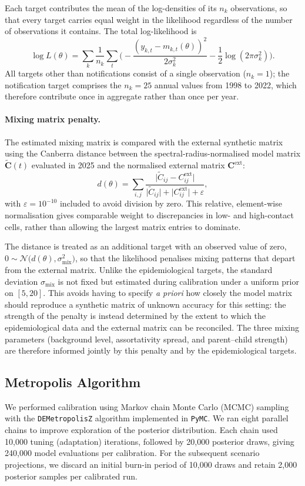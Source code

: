 \documentclass[11pt]{article}
\begin{document}
Each target contributes the mean of the log-densities of its \(n_k\) observations, so that every target carries equal weight in the likelihood regardless of the number of observations it contains. The total log-likelihood is
\[
\log L(\theta)
=
\sum_k
\frac{1}{n_k}
\sum_t
\Big(-\frac{(y_{k,t} - m_{k,t}(\theta))^2}{2\sigma_k^2}
-
\frac{1}{2}\log(2\pi\sigma_k^2)\Big).
\]
All targets other than notifications consist of a single observation (\(n_k = 1\)); the notification target comprises the \(n_k = 25\) annual values from 1998 to 2022, which therefore contribute once in aggregate rather than once per year.

\paragraph{Mixing matrix penalty.}
The estimated mixing matrix is compared with the external synthetic matrix using the Canberra distance between the spectral-radius-normalised model matrix \(\tilde{\mathbf{C}}(t)\) evaluated in 2025 and the normalised external matrix \(\mathbf{C}^{\mathrm{ext}}\):
\[
d(\theta)
=
\sum_{i,j}
\frac{\big|\tilde{C}_{ij} - C^{\mathrm{ext}}_{ij}\big|}
{\big|\tilde{C}_{ij}\big| + \big|C^{\mathrm{ext}}_{ij}\big| + \varepsilon},
\]
with \(\varepsilon = 10^{-10}\) included to avoid division by zero. This relative, element-wise normalisation gives comparable weight to discrepancies in low- and high-contact cells, rather than allowing the largest matrix entries to dominate.

The distance is treated as an additional target with an observed value of zero, \(0 \sim \mathcal{N}\big(d(\theta), \sigma_{\mathrm{mix}}^2\big)\), so that the likelihood penalises mixing patterns that depart from the external matrix. Unlike the epidemiological targets, the standard deviation \(\sigma_{\mathrm{mix}}\) is not fixed but estimated during calibration under a uniform prior on \([5, 20]\). This avoids having to specify \emph{a priori} how closely the model matrix should reproduce a synthetic matrix of unknown accuracy for this setting: the strength of the penalty is instead determined by the extent to which the epidemiological data and the external matrix can be reconciled. The three mixing parameters (background level, assortativity spread, and parent--child strength) are therefore informed jointly by this penalty and by the epidemiological targets.

\subsection{Metropolis Algorithm}
\label{sec:calibration-algorithm}
We performed calibration using Markov chain Monte Carlo (MCMC) sampling with the \texttt{DEMetropolisZ} algorithm implemented in \texttt{PyMC}. We ran eight parallel chains to improve exploration of the posterior distribution. Each chain used 10,000 tuning (adaptation) iterations, followed by 20,000 posterior draws, giving 240,000 model evaluations per calibration. For the subsequent scenario projections, we discard an initial burn-in period of 10,000 draws and retain 2,000 posterior samples per calibrated run.
\end{document}
